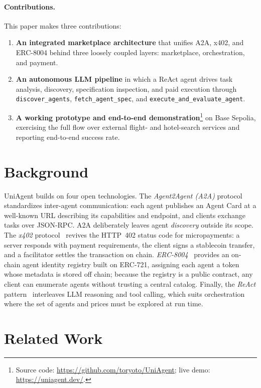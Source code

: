 \documentclass[sigconf]{acmart}
\begin{document}
\paragraph{Contributions.}
This paper makes three contributions:
\begin{enumerate}
  \item \textbf{An integrated marketplace architecture} that unifies
    A2A, x402, and ERC-8004 behind three loosely coupled layers:
    marketplace, orchestration, and payment.
  \item \textbf{An autonomous LLM pipeline} in which a ReAct agent
    drives task analysis, discovery, specification inspection, and paid
    execution through \texttt{discover\_agents},
    \texttt{fetch\_agent\_spec}, and
    \texttt{execute\_and\_evaluate\_agent}.
  \item \textbf{A working prototype and end-to-end
    demonstration}\footnote{Source code:
    \url{https://github.com/toryoto/UniAgent}; live demo:
    \url{https://uniagent.dev/}.} on Base Sepolia,
    exercising the full flow over external flight- and hotel-search
    services and reporting end-to-end success rate.
\end{enumerate}

\section{Background}
\label{sec:background}

UniAgent builds on four open technologies.
The \emph{Agent2Agent (A2A)} protocol~\cite{a2a2025} standardizes
inter-agent communication: each agent publishes an Agent Card at a
well-known URL describing its capabilities and endpoint, and clients
exchange tasks over JSON-RPC. A2A deliberately leaves agent
\emph{discovery} outside its scope.
The \emph{x402} protocol~\cite{x402whitepaper} revives the HTTP~402
status code for micropayments: a server responds with payment
requirements, the client signs a stablecoin transfer, and a facilitator
settles the transaction on chain.
\emph{ERC-8004}~\cite{erc8004} provides an on-chain agent identity
registry built on ERC-721, assigning each agent a token whose metadata
is stored off chain; because the registry is a public contract, any
client can enumerate agents without trusting a central catalog.
Finally, the \emph{ReAct} pattern~\cite{yao2023react} interleaves LLM
reasoning and tool calling, which suits orchestration where the set of
agents and prices must be explored at run time.

\section{Related Work}
\label{sec:related}
\end{document}
